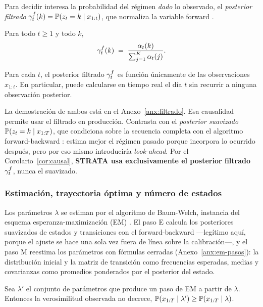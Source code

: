 Para decidir interesa la probabilidad del régimen \emph{dado} lo observado, el \emph{posterior filtrado} $\gamma^{f}_t(k) = \mathbb{P}(z_t = k \mid x_{1:t})$, que normaliza la variable forward \cite{rabiner1989, bishop2006}.

\begin{proposicion}
\label{prop:filtrado}
Para todo $t \ge 1$ y todo $k$,
\[
\gamma^{f}_t(k) \;=\; \frac{\alpha_t(k)}{\sum_{j=1}^{K} \alpha_t(j)}.
\]
\end{proposicion}

\begin{corolario}
\label{cor:causal}
Para cada $t$, el posterior filtrado $\gamma^{f}_t$ es función únicamente de las observaciones $x_{1:t}$. En particular, puede calcularse en tiempo real el día $t$ sin recurrir a ninguna observación posterior.
\end{corolario}

La demostración de ambos está en el Anexo~\ref{anx:filtrado}. Esa causalidad permite usar el filtrado en producción. Contrasta con el \emph{posterior suavizado} $\mathbb{P}(z_t = k \mid x_{1:T})$, que condiciona sobre la secuencia completa con el algoritmo forward-backward \cite{baum1970, rabiner1989}: estima mejor el régimen pasado porque incorpora lo ocurrido después, pero por eso mismo introduciría \emph{look-ahead}. Por el Corolario~\ref{cor:causal}, \textbf{STRATA usa exclusivamente el posterior filtrado $\gamma^{f}_t$}, nunca el suavizado.

\subsubsection{Estimación, trayectoria óptima y número de estados}
\label{sec:hmm-em}
\label{sec:hmm-viterbi}
\label{sec:hmm-K}

Los parámetros $\lambda$ se estiman por el algoritmo de Baum-Welch, instancia del esquema esperanza-maximización (EM) \cite{baum1970, dempster1977}. El paso E calcula los posteriores suavizados de estados y transiciones con el forward-backward —legítimo aquí, porque el ajuste se hace una sola vez fuera de línea sobre la calibración—, y el paso M reestima los parámetros con fórmulas cerradas (Anexo~\ref{anx:em-pasos}): la distribución inicial y la matriz de transición como frecuencias esperadas, medias y covarianzas como promedios ponderados por el posterior del estado.

\begin{lema}
\label{lem:em}
Sea $\lambda'$ el conjunto de parámetros que produce un paso de EM a partir de $\lambda$. Entonces la verosimilitud observada no decrece, $\mathbb{P}(x_{1:T} \mid \lambda') \ge \mathbb{P}(x_{1:T} \mid \lambda)$.
\end{lema}


